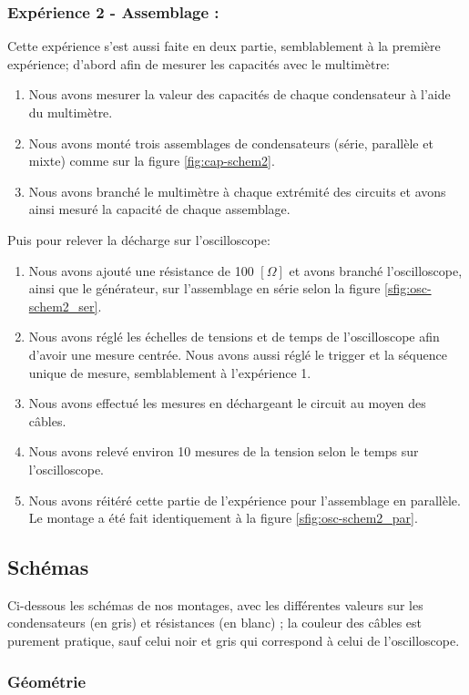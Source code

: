 \documentclass[11pt]{article}
\begin{document}
\subsubsection{Expérience 2 - Assemblage :}
Cette expérience s'est aussi faite en deux partie, semblablement à la première expérience; d'abord afin de mesurer les capacités avec le multimètre:
\begin{enumerate}
\item Nous avons mesurer la valeur des capacités de chaque condensateur à l'aide du multimètre.
\item Nous avons monté trois assemblages de condensateurs (série, parallèle et mixte) comme sur la figure \ref{fig:cap-schem2}.
\item Nous avons branché le multimètre à chaque extrémité des circuits et avons ainsi mesuré la capacité de chaque assemblage.
\end{enumerate}
Puis pour relever la décharge sur l'oscilloscope:
\begin{enumerate}
\item Nous avons ajouté une résistance de 100 $[\Omega]$ et avons branché l'oscilloscope, ainsi que le générateur, sur l'assemblage en série selon la figure \ref{sfig:osc-schem2_ser}.
\item Nous avons réglé les échelles de tensions et de temps de l'oscilloscope afin d'avoir une mesure centrée. Nous avons aussi réglé le trigger et la séquence unique de mesure, semblablement à l'expérience 1.
\item Nous avons effectué les mesures en déchargeant le circuit au moyen des câbles.
\item Nous avons relevé environ 10 mesures de la tension selon le temps sur l'oscilloscope.
\item Nous avons réitéré cette partie de l'expérience pour l'assemblage en parallèle. Le montage a été fait identiquement à la figure \ref{sfig:osc-schem2_par}.
\end{enumerate}

\subsection{Schémas}

Ci-dessous les schémas de nos montages, avec les différentes valeurs sur les condensateurs (en gris) et résistances (en blanc) ; la couleur des câbles est purement pratique, sauf celui noir et gris qui correspond à celui de l'oscilloscope.

\subsubsection*{Géométrie}
\end{document}
